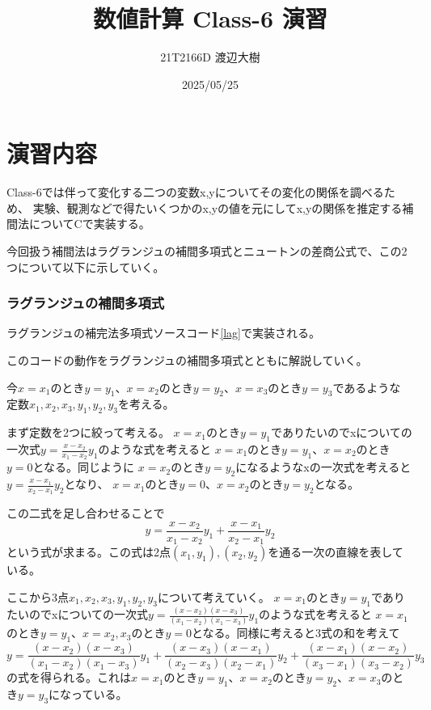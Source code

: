 \documentclass[a4paper,11pt,dvipdfmx]{jsarticle}
\begin{document}

\title{数値計算 Class-6 演習}
\author{21T2166D 渡辺大樹}
\date{2025/05/25}
\maketitle

\section{演習内容}
Class-6では伴って変化する二つの変数x,yについてその変化の関係を調べるため、
実験、観測などで得たいくつかのx,yの値を元にしてx,yの関係を推定する補間法についてCで実装する。

今回扱う補間法はラグランジュの補間多項式とニュートンの差商公式で、この2つについて以下に示していく。
\subsubsection{ラグランジュの補間多項式}
ラグランジュの補完法多項式ソースコード\ref{lag}で実装される。


このコードの動作をラグランジュの補間多項式とともに解説していく。

今$x=x_1$のとき$y=y_1$、$x=x_2$のとき$y=y_2$、$x=x_3$のとき$y=y_3$であるような
定数$x_1,x_2,x_3,y_1,y_2,y_3$を考える。

まず定数を2つに絞って考える。
$x=x_1$のとき$y=y_1$でありたいのでxについての一次式$y=\frac{x-x_2}{x_1-x_2}y_1$のような式を考えると
$x=x_1$のとき$y=y_1$、$x=x_2$のとき$y=0$となる。同じように
$x=x_2$のとき$y=y_2$になるようなxの一次式を考えると$y=\frac{x-x_1}{x_2-x_1}y_2$となり、
$x=x_1$のとき$y=0$、$x=x_2$のとき$y=y_2$となる。

この二式を足し合わせることで
\begin{equation*}
    y=\frac{x-x_2}{x_1-x_2}y_1 + \frac{x-x_1}{x_2-x_1}y_2
\end{equation*}
という式が求まる。この式は2点$(x_1,y_1),(x_2,y_2)$を通る一次の直線を表している。

ここから3点$x_1,x_2,x_3,y_1,y_2,y_3$について考えていく。
$x=x_1$のとき$y=y_1$でありたいのでxについての一次式$y=\frac{(x-x_2)(x-x_3)}{(x_1-x_2)(x_1-x_3)}y_1$のような式を考えると
$x=x_1$のとき$y=y_1$、$x=x_2,x_3$のとき$y=0$となる。同様に考えると3式の和を考えて
\begin{equation*}
    y=\frac{(x-x_2)(x-x_3)}{(x_1-x_2)(x_1-x_3)}y_1 + \frac{(x-x_3)(x-x_1)}{(x_2-x_3)(x_2-x_1)}y_2 + \frac{(x-x_1)(x-x_2)}{(x_3-x_1)(x_3-x_2)}y_3
\end{equation*}
の式を得られる。これは$x=x_1$のとき$y=y_1$、$x=x_2$のとき$y=y_2$、$x=x_3$のとき$y=y_3$になっている。
\end{document}
